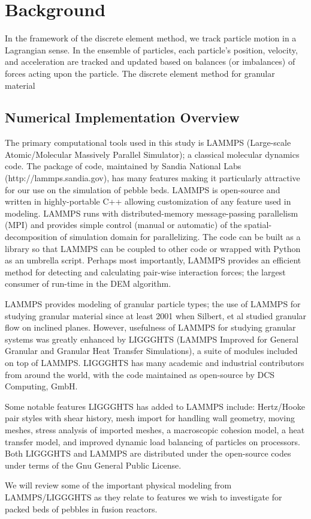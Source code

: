 \section{Background}
\label{sec:dem-intro}



In the framework of the discrete element method, we track particle motion in a Lagrangian sense. In the ensemble of particles, each particle's position, velocity, and acceleration are tracked and updated based on balances (or imbalances) of forces acting upon the particle. The discrete element method for granular material 

\subsection{Numerical Implementation Overview}

The primary computational tools used in this study is LAMMPS (Large-scale Atomic/Molecular Massively Parallel Simulator)\cite{Plimpton1995}; a classical molecular dynamics code. The package of code, maintained by Sandia National Labs (http://lammps.sandia.gov), has many features making it particularly attractive for our use on the simulation of pebble beds. LAMMPS is open-source and written in highly-portable C++ allowing customization of any feature used in modeling. LAMMPS runs with distributed-memory message-passing parallelism (MPI) and provides simple control (manual or automatic) of the spatial-decomposition of simulation domain for parallelizing. The code can be built as a library so that LAMMPS can be coupled to other code or wrapped with Python as an umbrella script. Perhaps most importantly, LAMMPS provides an efficient method for detecting and calculating pair-wise interaction forces; the largest consumer of run-time in the DEM algorithm\cite{Plimpton1995}.

LAMMPS provides modeling of granular particle types; the use of LAMMPS for studying granular material since at least 2001 when Silbert, et al\cite{Silbert2001} studied granular flow on inclined planes. However, usefulness of LAMMPS for studying granular systems was greatly enhanced by LIGGGHTS (LAMMPS Improved for General Granular and Granular Heat Transfer Simulations), a suite of modules included on top of LAMMPS. LIGGGHTS has many academic and industrial contributors from around the world, with the code maintained as open-source by DCS Computing, GmbH.

Some notable features LIGGGHTS has added to LAMMPS include: Hertz/Hooke pair styles with shear history, mesh import for handling wall geometry, moving meshes, stress analysis of imported meshes, a macroscopic cohesion model, a heat transfer model, and improved dynamic load balancing of particles on processors\cite{Kloss2011}. Both LIGGGHTS and LAMMPS are distributed under the open-source codes under terms of the Gnu General Public License.

We will review some of the important physical modeling from LAMMPS/LIGGGHTS as they relate to features we wish to investigate for packed beds of pebbles in fusion reactors.